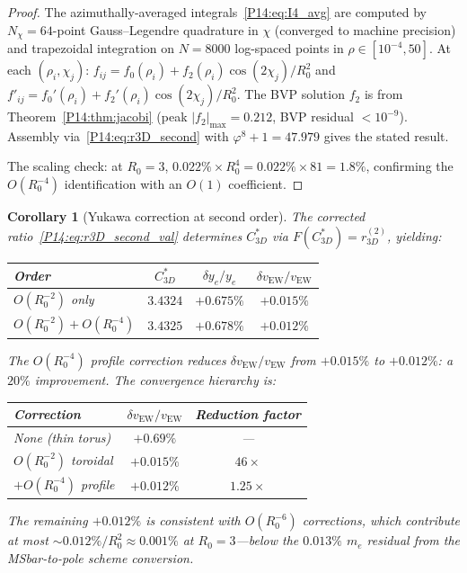 \documentclass[11pt,a4paper]{article}
\newtheorem{corollary}[theorem]{Corollary}
\theoremstyle{definition}
\theoremstyle{remark}
\newcommand{\vp}{\varphi}
\newcommand{\vEW}{v_{\mathrm{EW}}}
\newcommand{\Cstar}{C^*}
\newcommand{\fzero}{f_0}
\newcommand{\ftwo}{f_2}
\newcommand{\Rzero}{R_0}
\begin{document}
\begin{proof}
The azimuthally-averaged integrals~\eqref{P14:eq:I4_avg} are computed
by $N_\chi=64$-point Gauss--Legendre quadrature in $\chi$ (converged
to machine precision) and trapezoidal integration on
$N=8000$ log-spaced points in $\rho\in[10^{-4},50]$.
At each $(\rho_i,\chi_j)$:
$f_{ij} = \fzero(\rho_i) + \ftwo(\rho_i)\cos(2\chi_j)/\Rzero^2$
and $f'_{ij} = \fzero'(\rho_i) + \ftwo'(\rho_i)\cos(2\chi_j)/\Rzero^2$.
The BVP solution $\ftwo$ is from Theorem~\ref{P14:thm:jacobi}
(peak $|\ftwo|_{\max}=0.212$, BVP residual $<10^{-9}$).
Assembly via~\eqref{P14:eq:r3D_second} with $\vp^8+1=47.979$ gives the
stated result.

The scaling check: at $\Rzero=3$,
$0.022\%\times\Rzero^4 = 0.022\%\times81 = 1.8\%$,
confirming the $O(\Rzero^{-4})$ identification with an $O(1)$
coefficient.
\end{proof}

\begin{corollary}[Yukawa correction at second order]
\label{P14:cor:yukawa_second}
The corrected ratio~\eqref{P14:eq:r3D_second_val} determines
$\Cstar_{3D}$ via $F(\Cstar_{3D}) = r_{3D}^{(2)}$, yielding:
\begin{center}
\renewcommand{\arraystretch}{1.3}
\begin{tabular}{lccc}
\toprule
Order & $\Cstar_{3D}$ & $\delta y_e/y_e$ & $\delta\vEW/\vEW$ \\
\midrule
$O(\Rzero^{-2})$ only & $3.4324$ & $+0.675\%$ & $+0.015\%$ \\
$O(\Rzero^{-2})+O(\Rzero^{-4})$ & $3.4325$ & $+0.678\%$ & $+0.012\%$ \\
\bottomrule
\end{tabular}
\end{center}
The $O(\Rzero^{-4})$ profile correction reduces
$\delta\vEW/\vEW$ from $+0.015\%$ to $+0.012\%$: a $20\%$
improvement.  The convergence hierarchy is:
\begin{center}
\renewcommand{\arraystretch}{1.3}
\begin{tabular}{lcc}
\toprule
Correction & $\delta\vEW/\vEW$ & Reduction factor \\
\midrule
None (thin torus) & $+0.69\%$ & --- \\
$O(\Rzero^{-2})$ toroidal & $+0.015\%$ & $46\times$ \\
$+ O(\Rzero^{-4})$ profile & $+0.012\%$ & $1.25\times$ \\
\bottomrule
\end{tabular}
\end{center}
The remaining $+0.012\%$ is consistent with $O(\Rzero^{-6})$
corrections, which contribute at most
$\sim0.012\%/\Rzero^2 \approx 0.001\%$ at $\Rzero=3$---below the
$0.013\%$ $m_e$ residual from the MSbar-to-pole scheme conversion.
\end{corollary}
\end{document}
